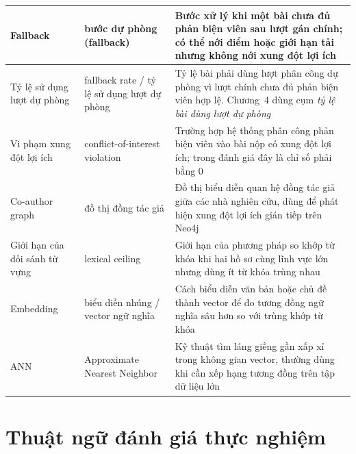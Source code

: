 \begin{longtable}{|C{0.16\textwidth}|P{0.22\textwidth}|P{0.55\textwidth}|}
  Fallback     &     bước dự phòng (fallback)     &     Bước xử lý khi một bài chưa đủ phản biện viên sau lượt gán chính; có thể nới điểm hoặc giới hạn tải nhưng không nới xung đột lợi ích \\ \hline
  Tỷ lệ sử dụng lượt dự phòng      &      fallback rate / tỷ lệ sử dụng lượt dự phòng      &      Tỷ lệ bài phải dùng lượt phân công dự phòng vì lượt chính chưa đủ phản biện viên hợp lệ. Chương~4 dùng cụm \textit{tỷ lệ bài dùng lượt dự phòng} \\ \hline
  Vi phạm xung đột lợi ích     &     conflict-\allowbreak of-\allowbreak interest violation     &     Trường hợp hệ thống phân công phản biện viên vào bài nộp có xung đột lợi ích; trong đánh giá đây là chỉ số phải bằng 0 \\ \hline
  Co-\allowbreak author graph      &      đồ thị đồng tác giả      &      Đồ thị biểu diễn quan hệ đồng tác giả giữa các nhà nghiên cứu, dùng để phát hiện xung đột lợi ích gián tiếp trên Neo4j \\ \hline
  Giới hạn của đối sánh từ vựng     &     lexical ceiling     &     Giới hạn của phương pháp so khớp từ khóa khi hai hồ sơ cùng lĩnh vực lớn nhưng dùng ít từ khóa trùng nhau \\ \hline
  Embedding     &     biểu diễn nhúng / vector ngữ nghĩa     &     Cách biểu diễn văn bản hoặc chủ đề thành vector để đo tương đồng ngữ nghĩa sâu hơn so với trùng khớp từ khóa \\ \hline
  ANN      &      Approximate Nearest Neighbor      &      Kỹ thuật tìm láng giềng gần xấp xỉ trong không gian vector, thường dùng khi cần xếp hạng tương đồng trên tập dữ liệu lớn \\ \hline
\end{longtable}
\endgroup

\section*{Thuật ngữ đánh giá thực nghiệm}

